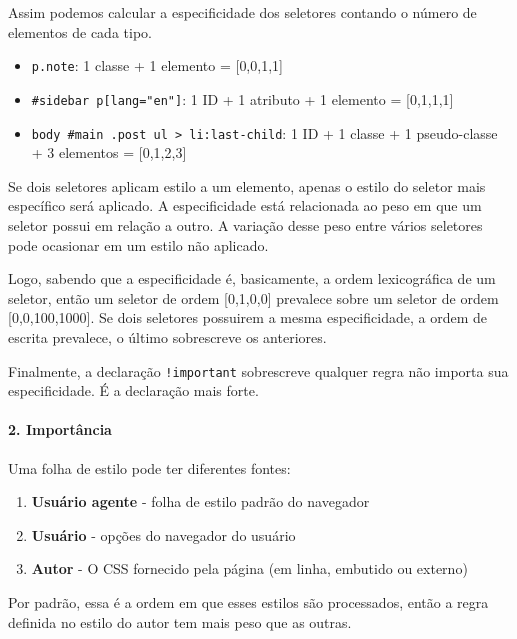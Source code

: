 Assim podemos calcular a especificidade dos seletores contando o número de elementos de cada tipo.

\begin{itemize}
\tightlist
\item
  \texttt{p.note}: 1 classe + 1 elemento = {[}0,0,1,1{]}
  \item
  \texttt{\#sidebar p{[}lang="en"{]}}:  1 ID + 1 atributo + 1 elemento = {[}0,1,1,1{]}
  \item
  \texttt{body \#main .post ul > li:last-child}: 1 ID + 1 classe + 1 pseudo-classe + 3 elementos = {[}0,1,2,3{]}
\end{itemize}

Se dois seletores aplicam estilo a um elemento, apenas o estilo do
seletor mais específico será aplicado. A especificidade está relacionada
ao peso em que um seletor possui em relação a outro. A variação desse
peso entre vários seletores pode ocasionar em um estilo não aplicado. 

Logo, sabendo que a especificidade é, basicamente, a ordem lexicográfica de um seletor, então um seletor de ordem {[}0,1,0,0{]} prevalece sobre um seletor de ordem {[}0,0,100,1000{]}. Se dois seletores possuirem a mesma especificidade, a ordem de escrita prevalece, o último sobrescreve os anteriores.

Finalmente, a declaração \texttt{!important} sobrescreve qualquer regra não importa sua especificidade. É a declaração mais forte.

\hypertarget{importuxe2ncia}{%
\paragraph{2. Importância}\label{importuxe2ncia}}

Uma folha de estilo pode ter diferentes fontes:

\begin{enumerate}
\def\labelenumi{\arabic{enumi}.}
\tightlist
\item
  \textbf{Usuário agente} - folha de estilo padrão do navegador
\item
  \textbf{Usuário} - opções do navegador do usuário
\item
  \textbf{Autor} - O CSS fornecido pela página (em linha, embutido ou
  externo)
\end{enumerate}

Por padrão, essa é a ordem em que esses estilos são processados, então a
regra definida no estilo do autor tem mais peso que as outras.

